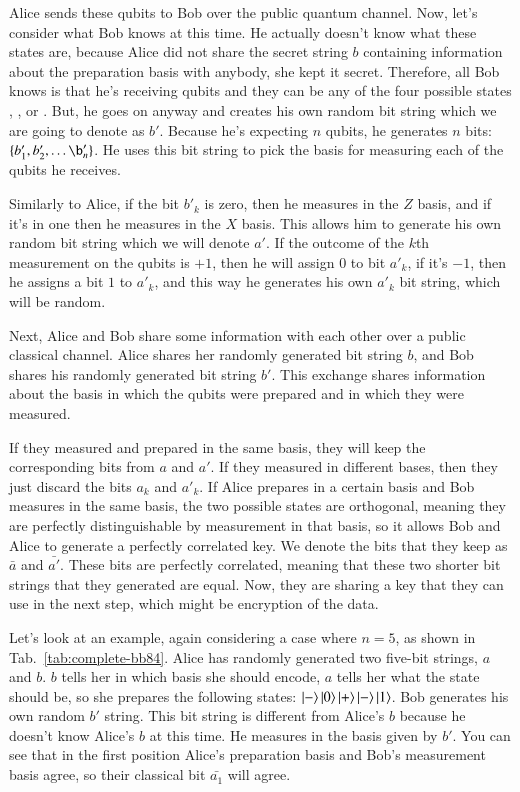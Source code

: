 Alice sends these qubits to Bob over the public quantum channel. Now, let's consider what Bob knows at this time. He actually doesn't know what these states are, because Alice did not share the secret string $b$ containing information about the preparation basis with anybody, she kept it secret. Therefore, all Bob knows is that he's receiving qubits and they can be any of the four possible states , , \ket{+} or \ket{-}. But, he goes on anyway and creates his own random bit string which we are going to denote as $b'$. Because he's expecting $n$ qubits, he generates $n$ bits: $\{b'_1, b'_2, \ldots\b'_n\}$.  He uses this bit string to pick the basis for measuring each of the qubits he receives.

Similarly to Alice, if the bit $b'_k$ is zero, then he measures in the $Z$ basis, and if it's in one then he measures in the $X$ basis. This allows him to generate his own random bit string which we will denote $a'$. If the outcome of the $k$th measurement on the qubits is $+1$, then he will assign $0$ to bit $a'_k$, if it's $-1$, then he assigns a bit $1$ to $a'_k$, and this way he generates his own $a'_k$ bit string, which will be random.

Next, Alice and Bob share some information with each other over a public classical channel. Alice shares her randomly generated bit string $b$, and Bob shares his randomly generated bit string $b'$.  This exchange shares information about the basis in which the qubits were prepared and in which they were measured.

If they measured and prepared in the same basis, they will keep the corresponding bits from $a$ and $a'$. If they measured in different bases, then they just discard the bits $a_k$ and $a'_k$. If Alice prepares in a certain basis and Bob measures in the same basis, the two possible states are orthogonal, meaning they are perfectly distinguishable by measurement in that basis, so it allows Bob and Alice to generate a perfectly correlated key. We denote the bits that they keep as $\bar{a}$ and $\bar{a'}$. These bits are perfectly correlated, meaning that these two shorter bit strings that they generated are equal. Now, they are sharing a key that they can use in the next step, which might be encryption of the data.

Let's look at an example, again considering a case where $n=5$, as shown in Tab.~\ref{tab:complete-bb84}. Alice has randomly generated two five-bit strings, $a$ and $b$. $b$ tells her in which basis she should encode, $a$ tells her what the state should be, so she prepares the following states: $\left| - \right\rangle\left| 0 \right\rangle\left| + \right\rangle\left| - \right\rangle\left| 1 \right\rangle$. Bob generates his own random $b'$ string. This bit string is different from Alice's $b$ because he doesn't know Alice's $b$ at this time. He measures in the basis given by $b'$.  You can see that in the first position Alice's preparation basis and Bob's measurement basis agree, so their classical bit $\bar{a_1}$ will agree.

